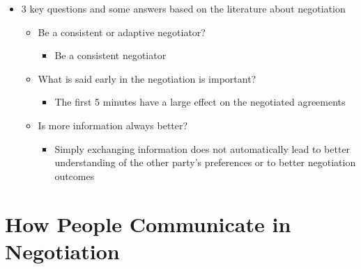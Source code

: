 \documentclass[
  ignorenonframetext,
]{beamer}
\providecommand{\tightlist}{%
  \setlength{\itemsep}{0pt}\setlength{\parskip}{0pt}}\usepackage{longtable,booktabs,array}
\begin{document}
\begin{frame}{}
\label{section-12}
\begin{itemize}
\item
  3 key questions and some answers based on the literature about
  negotiation

  \begin{itemize}
  \item
    Be a consistent or adaptive negotiator?

    \begin{itemize}
    \tightlist
    \item
      Be a consistent negotiator
    \end{itemize}
  \item
    What is said early in the negotiation is important?

    \begin{itemize}
    \tightlist
    \item
      The first 5 minutes have a large effect on the negotiated
      agreements
    \end{itemize}
  \item
    Is more information always better?

    \begin{itemize}
    \tightlist
    \item
      Simply exchanging information does not automatically lead to
      better understanding of the other party's preferences or to better
      negotiation outcomes
    \end{itemize}
  \end{itemize}
\end{itemize}
\end{frame}

\section{How People Communicate in
Negotiation}\label{how-people-communicate-in-negotiation}
\end{document}
